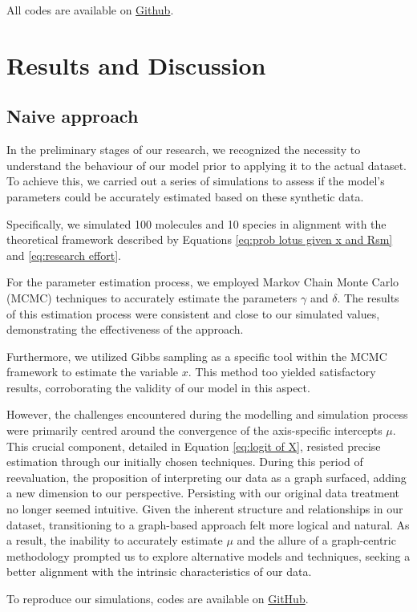 \documentclass[
11pt, %
oneside, %
english, %
singlespacing, %
headsepline, %
chapterinoneline, %
]{MastersDoctoralThesis} %
\begin{document}
All codes are available on \href{https://github.com/anticipated-lotus/GNN}{Github}.


\chapter{Results and Discussion}
\section{Naive approach}
In the preliminary stages of our research, we recognized the necessity to understand the behaviour of our model prior to applying it to the actual dataset. To achieve this, we carried out a series of simulations to assess if the model's parameters could be accurately estimated based on these synthetic data.

Specifically, we simulated 100 molecules and 10 species in alignment with the theoretical framework described by Equations \ref{eq:prob lotus given x and Rsm} and \ref{eq:research effort}.

For the parameter estimation process, we employed Markov Chain Monte Carlo (MCMC) techniques to accurately estimate the parameters $\gamma$ and $\delta$. The results of this estimation process were consistent and close to our simulated values, demonstrating the effectiveness of the approach.

Furthermore, we utilized Gibbs sampling as a specific tool within the MCMC framework to estimate the variable $x$. This method too yielded satisfactory results, corroborating the validity of our model in this aspect.

However, the challenges encountered during the modelling and simulation process were primarily centred around the convergence of the axis-specific intercepts $\mu$. This crucial component, detailed in Equation \ref{eq:logit of X}, resisted precise estimation through our initially chosen techniques. During this period of reevaluation, the proposition of interpreting our data as a graph surfaced, adding a new dimension to our perspective. Persisting with our original data treatment no longer seemed intuitive. Given the inherent structure and relationships in our dataset, transitioning to a graph-based approach felt more logical and natural. As a result, the inability to accurately estimate $\mu$ and the allure of a graph-centric methodology prompted us to explore alternative models and techniques, seeking a better alignment with the intrinsic characteristics of our data.

To reproduce our simulations, codes are available on \href{https://github.com/commons-research/anticipated-lotus}{GitHub}.
\end{document}
